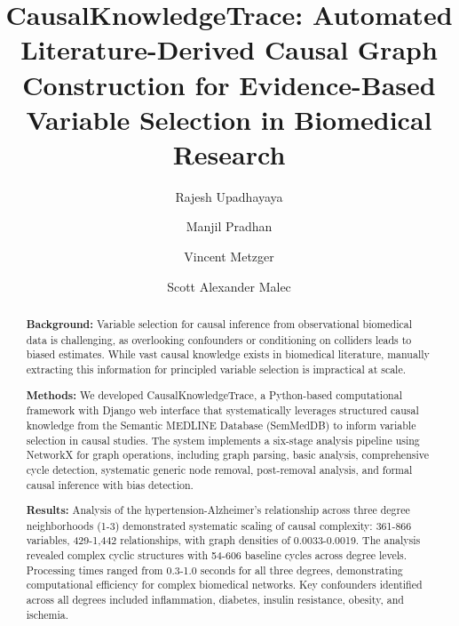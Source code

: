 \documentclass[preprint,12pt,numbers,sort&compress]{elsarticle}
\begin{document}
\begin{frontmatter}

\title{CausalKnowledgeTrace: Automated Literature-Derived Causal Graph Construction for Evidence-Based Variable Selection in Biomedical Research}

\author[inst1]{Rajesh Upadhayaya}

\author[inst1]{Manjil Pradhan}

\author[inst2]{Vincent Metzger}

\author[inst2]{Scott Alexander Malec}





\begin{abstract}
\textbf{Background:} Variable selection for causal inference from observational biomedical data is challenging, as overlooking confounders or conditioning on colliders leads to biased estimates. While vast causal knowledge exists in biomedical literature, manually extracting this information for principled variable selection is impractical at scale.

\textbf{Methods:} We developed CausalKnowledgeTrace, a Python-based computational framework with Django web interface that systematically leverages structured causal knowledge from the Semantic MEDLINE Database (SemMedDB) to inform variable selection in causal studies. The system implements a six-stage analysis pipeline using NetworkX for graph operations, including graph parsing, basic analysis, comprehensive cycle detection, systematic generic node removal, post-removal analysis, and formal causal inference with bias detection.

\textbf{Results:} Analysis of the hypertension-Alzheimer's relationship across three degree neighborhoods (1-3) demonstrated systematic scaling of causal complexity: 361-866 variables, 429-1,442 relationships, with graph densities of 0.0033-0.0019. The analysis revealed complex cyclic structures with 54-606 baseline cycles across degree levels. Processing times ranged from 0.3-1.0 seconds for all three degrees, demonstrating computational efficiency for complex biomedical networks. Key confounders identified across all degrees included inflammation, diabetes, insulin resistance, obesity, and ischemia.


\end{abstract}
\end{frontmatter}
\end{document}
